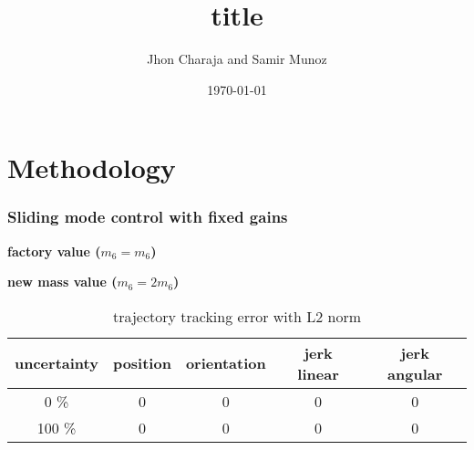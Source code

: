 

\title[Article presentation]{title}

\author[J. Charaja and S. Munoz]{Jhon Charaja and Samir Munoz}
\date{\today}



	\frame{\titlepage}
	\section{Methodology}
	
	\begin{frame}
		\frametitle{Sliding mode control with fixed gains}
		
		\fboxrule=3pt
		\begin{minipage}[t]{0.45\textwidth}
			\graphicspath{{images/methodology/SMC/exp1/circular/uncertainty_100_alpha_0/}}
			\centering
			{\large \textbf{factory value ($m_6=m_6$)}}
		\end{minipage}
		\hspace{.08\textwidth}
		\begin{minipage}[t]{0.45\textwidth}
			\graphicspath{{images/methodology/SMC/exp1/circular/uncertainty_100_alpha_0/}}
			\centering
			{\large \textbf{new mass value ($m_6=2 m_6$)}}
		\end{minipage}
		
		\begin{table}
			\caption{trajectory tracking error with L2 norm}
			\centering
			\begin{tabular}{c c c c c}
			\toprule
			uncertainty & position & orientation & jerk linear & jerk angular \\
			\midrule
			0 \%  & 0 & 0 & 0 & 0 \\ 
			100 \% & 0 & 0 & 0 & 0  \\
			\bottomrule
			\end{tabular}
		\end{table}

	\end{frame}


